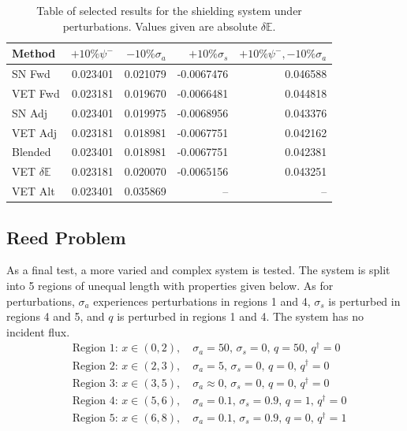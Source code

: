 \documentclass[12pt]{report}
\newcommand{\Edd}{\mathbb{E}}
\newcommand{\sigs}{\sigma_s}
\newcommand{\siga}{\sigma_a}
\begin{document}
\begin{table}[H]
\centering
  \begin{tabular}{| l | r | r | r | r |}
    \hline
    Method  &  $+10\% \psi^- $  & $-10\% \siga $ & $+10\% \sigs $ & $+10\% \psi^-,-10\% \siga$ \\ \hline
     SN Fwd 			&0.023401 &0.021079 &-0.0067476 & 0.046588\\ \hline
     VET Fwd			&0.023181 &0.019670 &-0.0066481 &0.044818\\ \hline
     SN Adj  			&0.023401 &0.019975 &-0.0068956 &0.043376\\ \hline
     VET Adj 			&0.023181 &0.018981 &-0.0067751 &0.042162\\ \hline
     Blended 			&0.023401 &0.018981 &-0.0067751 &0.042381\\ \hline
     VET $\delta \Edd$ 	&0.023181 &0.020070 &-0.0065156 &0.043251\\ \hline
     VET Alt			&0.023401 &0.035869 &	--		&  --\\ \hline
    \end{tabular}
  \caption{Table of selected results for the shielding system under perturbations. Values given are absolute $\delta \Edd$. }
\end{table}

\subsection{Reed Problem}
As a final test, a more varied and complex system is tested. The system is split into 5 regions of unequal length with properties given below. As for perturbations, $\siga$ experiences perturbations in regions 1 and 4, $\sigs$ is perturbed in regions 4 and 5, and $q$ is perturbed in regions 1 and 4. The system has no incident flux.
\begin{equation*}
\begin{split}
&\text{Region 1: } x \in (0,2), \quad \siga=50, \, 			\sigs=0, \, q=50, \, q^\dag=0 \\
&\text{Region 2: } x \in (2,3), \quad \siga=5, \, 			\sigs=0, \, q=0, \, q^\dag=0 \\
&\text{Region 3: } x \in (3,5), \quad \siga \approx 0, \,	\sigs=0, \, q=0, \, q^\dag=0 \\
&\text{Region 4: } x \in (5,6), \quad \siga=0.1, \, 		\sigs=0.9, \, q=1, \, q^\dag=0 \\
&\text{Region 5: } x \in (6,8), \quad \siga=0.1, \, 		\sigs=0.9, \, q=0, \, q^\dag=1 \\
\end{split}
\end{equation*}
\end{document}
